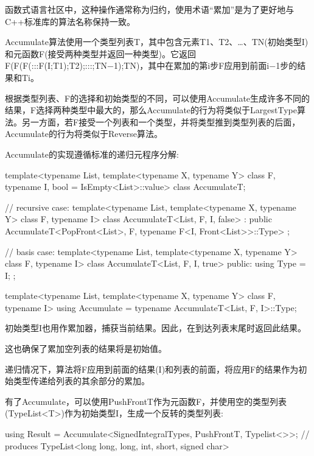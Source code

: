 \begin{notice}
函数式语言社区中，这种操作通常称为归约，使用术语“累加”是为了更好地与C++标准库的算法名称保持一致。
\end{notice}

Accumulate算法使用一个类型列表T，其中包含元素T1、T2、…、TN(初始类型I)和元函数F(接受两种类型并返回一种类型)。它返回F(F(F(:::F(I;T1);T2);:::;TN−1);TN)，其中在累加的第i步F应用到前面i−1步的结果和Ti。

根据类型列表、F的选择和初始类型的不同，可以使用Accumulate生成许多不同的结果，F选择两种类型中最大的，那么Accumulate的行为将类似于LargestType算法。另一方面，若F接受一个列表和一个类型，并将类型推到类型列表的后面，Accumulate的行为将类似于Reverse算法。

Accumulate的实现遵循标准的递归元程序分解:

\begin{cpp}
template<typename List,
		template<typename X, typename Y> class F,
		typename I,
		bool = IsEmpty<List>::value>
class AccumulateT;

// recursive case:
template<typename List,
		template<typename X, typename Y> class F,
		typename I>
class AccumulateT<List, F, I, false>
: public AccumulateT<PopFront<List>, F,
					typename F<I, Front<List>>::Type>
{
};

// basis case:
template<typename List,
		template<typename X, typename Y> class F,
		typename I>
class AccumulateT<List, F, I, true>
{
	public:
	using Type = I;
};

template<typename List,
		template<typename X, typename Y> class F,
		typename I>
using Accumulate = typename AccumulateT<List, F, I>::Type;
\end{cpp}

初始类型I也用作累加器，捕获当前结果。因此，在到达列表末尾时返回此结果。

\begin{notice}
这也确保了累加空列表的结果将是初始值。
\end{notice}

递归情况下，算法将F应用到前面的结果(I)和列表的前面，将应用F的结果作为初始类型传递给列表的其余部分的累加。

有了Accumulate，可以使用PushFrontT作为元函数F，并使用空的类型列表(TypeList<T>)作为初始类型I，生成一个反转的类型列表:

\begin{cpp}
using Result = Accumulate<SignedIntegralTypes, PushFrontT, Typelist<>>;
				// produces TypeList<long long, long, int, short, signed char>
\end{cpp}

